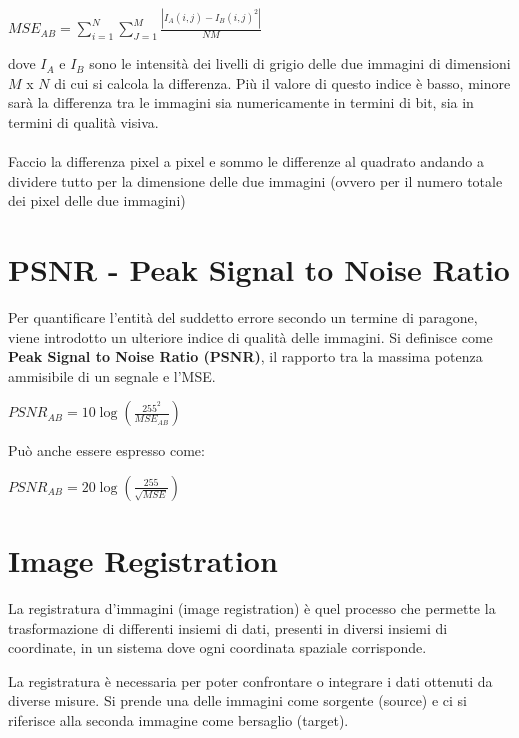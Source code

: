 \begin{center}
    $MSE_{AB} = \sum_{i=1}^{N}\sum_{J=1}^{M}\frac{|I_A(i,j)-I_B(i,j)^2|}{NM}$
\end{center}

dove $I_A$ e $I_B$ sono le intensità dei livelli di grigio delle due immagini di dimensioni $M$ x $N$ di cui si calcola la differenza. Più il valore di questo indice è basso, minore sarà la differenza tra
le immagini sia numericamente in termini di bit, sia in termini di qualità visiva.
\\\\
Faccio la differenza pixel a pixel e sommo le differenze al quadrato andando a dividere tutto per la dimensione delle due immagini (ovvero per il numero totale dei pixel delle due immagini)

\section{PSNR - Peak Signal to Noise Ratio}

Per quantificare l'entità del suddetto errore secondo un termine di paragone, viene introdotto un ulteriore indice di qualità delle
immagini. Si definisce come \textbf{Peak Signal to Noise Ratio (PSNR)}, il rapporto
tra la massima potenza ammisibile di un segnale e l'MSE.

\begin{center}
    $PSNR_{AB} = 10 \log(\frac{255^2}{MSE_{AB}})$
\end{center}

Può anche essere espresso come:

\begin{center}
    $PSNR_{AB} = 20 \log(\frac{255}{\sqrt{MSE}})$
\end{center}

\newpage
\section{Image Registration}

\begin{definition}
    La registratura d'immagini (image registration) è quel processo che permette la trasformazione di differenti insiemi di dati, presenti in diversi insiemi di coordinate, in un sistema dove ogni coordinata
    spaziale corrisponde.
\end{definition}

La registratura è necessaria per poter confrontare o integrare i dati ottenuti da diverse misure. Si prende una delle immagini come sorgente (source) e ci si
riferisce alla seconda immagine come bersaglio (target).

